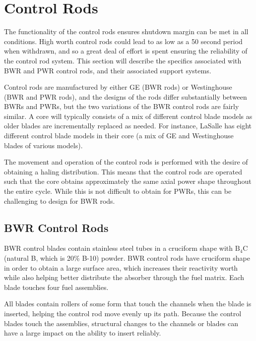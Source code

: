 \documentclass[10pt]{article}
\begin{document}
\tableofcontents
\clearpage

\section{Control Rods}

The functionality of the control rods ensures shutdown margin can be met in all conditions. High worth control rods could lead to as low as a 50 second period when withdrawn, and so a great deal of effort is spent ensuring the reliability of the control rod system. This section will describe the specifics associated with BWR and PWR control rods, and their associated support systems. 

Control rods are manufactured by either GE (BWR rods) or Westinghouse (BWR and PWR rods), and the designs of the rods differ substantially between BWRs and PWRs, but the two variations of the BWR control rods are fairly similar. A core will typically consists of a mix of different control blade models as older blades are incrementally replaced as needed. For instance, LaSalle has eight different control blade models in their core (a mix of GE and Westinghouse blades of various models). 

The movement and operation of the control rods is performed with the desire of obtaining a haling distribution. This means that the control rods are operated such that the core obtains approximately the same axial power shape throughout the entire cycle. While this is not difficult to obtain for PWRs, this can be challenging to design for BWR rods. 


\subsection{BWR Control Rods}

BWR control blades contain stainless steel tubes in a cruciform shape with \(\textrm{B}_4\)C (natural B, which is 20\% B-10) powder. BWR control rods have cruciform shape in order to obtain a large surface area, which increases their reactivity worth while also helping better distribute the absorber through the fuel matrix. Each blade touches four fuel assemblies. 

All blades contain rollers of some form that touch the channels when the blade is inserted, helping the control rod move evenly up its path. Because the control blades touch the assemblies, structural changes to the channels or blades can have a large impact on the ability to insert reliably.
\end{document}
